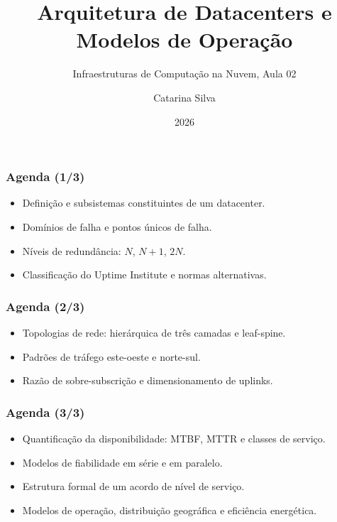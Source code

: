 \documentclass[aspectratio=169]{beamer}
\title{Arquitetura de Datacenters e Modelos de Operação}
\subtitle{Infraestruturas de Computação na Nuvem, Aula 02}
\author{Catarina Silva}
\institute{ESTGA, Universidade de Aveiro}
\date{2026}
\begin{document}
\begin{frame}[plain]
  \titlepage
\end{frame}

\begin{frame}
\frametitle{Agenda \textcolor{NudeTaupe}{\small(1/3)}}
\begin{itemize}
    \setlength\itemsep{0.4cm}
    \item Definição e subsistemas constituintes de um datacenter.
    \item Domínios de falha e pontos únicos de falha.
    \item Níveis de redundância: $N$, $N+1$, $2N$.
    \item Classificação do Uptime Institute e normas alternativas.
\end{itemize}
\end{frame}

\begin{frame}
\frametitle{Agenda \textcolor{NudeTaupe}{\small(2/3)}}
\begin{itemize}
    \setlength\itemsep{0.4cm}
    \item Topologias de rede: hierárquica de três camadas e leaf-spine.
    \item Padrões de tráfego este-oeste e norte-sul.
    \item Razão de sobre-subscrição e dimensionamento de uplinks.
\end{itemize}
\end{frame}

\begin{frame}
\frametitle{Agenda \textcolor{NudeTaupe}{\small(3/3)}}
\begin{itemize}
    \setlength\itemsep{0.4cm}
    \item Quantificação da disponibilidade: MTBF, MTTR e classes de serviço.
    \item Modelos de fiabilidade em série e em paralelo.
    \item Estrutura formal de um acordo de nível de serviço.
    \item Modelos de operação, distribuição geográfica e eficiência energética.
\end{itemize}
\end{frame}
\end{document}
